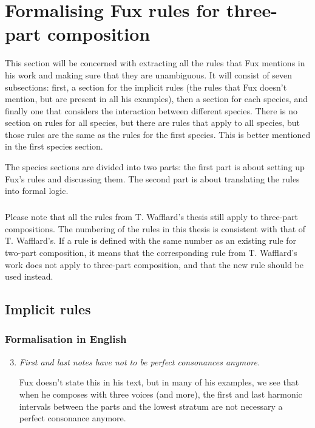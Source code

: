 \chapter{Formalising Fux rules for three-part composition}
This section will be concerned with extracting all the rules that Fux mentions in his work and making sure that they are unambiguous.
It will consist of seven subsections: first, a section for the implicit rules (the rules that Fux doesn't mention, but are present in all his examples), then a section for each species, and finally one that considers the interaction between different species. There is no section on rules for all species, but there are rules that apply to all species, but those rules are the same as the rules for the first species. This is better mentioned in the first species section.


The species sections are divided into two parts: the first part is about setting up Fux's rules and discussing them. The second part is about translating the rules into formal logic.

\paragraph{}
Please note that all the rules from T. Wafflard's thesis still apply to three-part compositions. The numbering of the rules in this thesis is consistent with that of T. Wafflard's. If a rule is defined with the same number as an existing rule for two-part composition, it means that the corresponding rule from T. Wafflard's work does not apply to three-part composition, and that the new rule should be used instead.
\section{Implicit rules}
\subsection{Formalisation in English} \label{sec:generalenglish}
\begin{enumerate}[wide, label=\bfseries 1.H2 and 1.H\arabic*]
    \setcounter{enumi}{2} %
    \item \textit{First and last notes have not to be perfect consonances anymore.} \label{rule:last-chord-not-perfect-anymore}    

    Fux doesn't state this in his text, but in many of his examples, we see that when he composes with three voices (and more), the first and last harmonic intervals between the parts and the lowest stratum are not necessary a perfect consonance anymore.
\end{enumerate}

